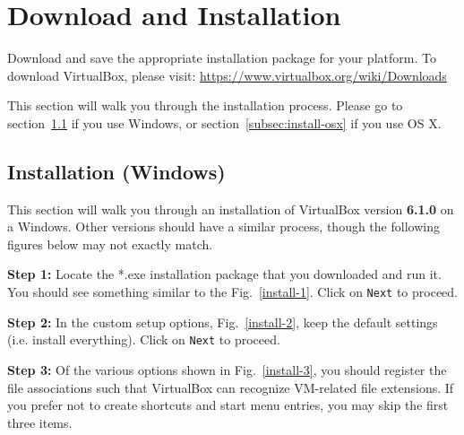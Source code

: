 \documentclass[11pt]{article}
\begin{document}
\section{Download and Installation}
\label{sec:download}
Download and save the appropriate installation package for your platform. To download VirtualBox, please visit: \url{https://www.virtualbox.org/wiki/Downloads}

This section will walk you through the installation process. Please go to section~\ref{subsec:install-windows} if you use Windows, or section~\ref{subsec:install-osx} if you use OS X.



\subsection{Installation (Windows)}
\label{subsec:install-windows}
This section will walk you through an installation of VirtualBox version \textbf{6.1.0} on a Windows. Other versions should have a similar process, though the following figures below may not exactly match.

\textbf{Step 1:} Locate the *.exe installation package that you downloaded and run it. You should see something similar to the Fig.~\ref{install-1}. Click on \texttt{Next} to proceed.

\textbf{Step 2:} In the custom setup options, Fig.~\ref{install-2}, keep the default settings (i.e. install everything). Click on \texttt{Next} to proceed.

\textbf{Step 3:} Of the various options shown in Fig.~\ref{install-3}, you should register the file associations such that VirtualBox can recognize VM-related file extensions. If you prefer not to create shortcuts and start menu entries, you may skip the first three items.
\end{document}
